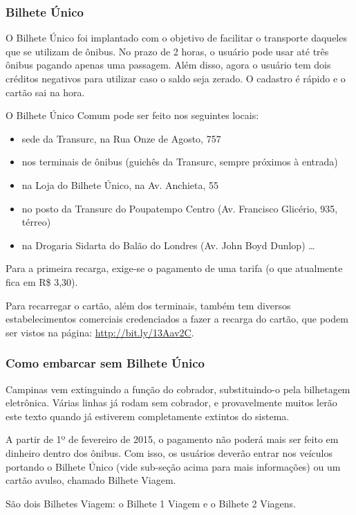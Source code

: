 \subsubsection*{Bilhete Único}

O Bilhete Único foi implantado com o objetivo de facilitar o transporte daqueles
que se utilizam de ônibus. No prazo de 2 horas, o usuário pode usar até três
ônibus pagando apenas uma passagem. Além disso, agora o usuário tem dois
créditos negativos para utilizar caso o saldo seja zerado. O cadastro é rápido e
o cartão sai na hora.

O Bilhete Único Comum pode ser feito nos seguintes locais:
\begin{itemize}
  \item sede da Transurc, na Rua Onze de Agosto, 757
  \item nos terminais de ônibus (guichês da Transurc, sempre próximos à entrada)
  \item na Loja do Bilhete Único, na Av. Anchieta, 55
  \item no posto da Transurc do Poupatempo Centro (Av. Francisco Glicério, 935,
térreo)
  \item na Drogaria Sidarta do Balão do Londres (Av. John Boyd Dunlop) \ldots
\end{itemize}

Para a primeira recarga, exige-se o pagamento de uma tarifa (o que atualmente
fica em R\$ 3,30).

Para recarregar o cartão, além dos terminais, também tem diversos
estabelecimentos comerciais credenciados a fazer a recarga do cartão, que podem
ser vistos na página:
\url{http://bit.ly/13Aav2C}.

\subsubsection*{Como embarcar sem Bilhete Único}

Campinas vem extinguindo a função do cobrador, substituindo-o pela bilhetagem
eletrônica. Várias linhas já rodam sem cobrador, e provavelmente muitos lerão
este texto quando já estiverem completamente extintos do sistema.

A partir de 1º de fevereiro de 2015, o pagamento não poderá mais ser feito em
dinheiro dentro dos ônibus. Com isso, os usuários deverão entrar nos veículos
portando o Bilhete Único (vide sub-seção acima para mais informações) ou um
cartão avulso, chamado Bilhete Viagem.

São dois Bilhetes Viagem: o Bilhete 1 Viagem e o Bilhete 2 Viagens.

